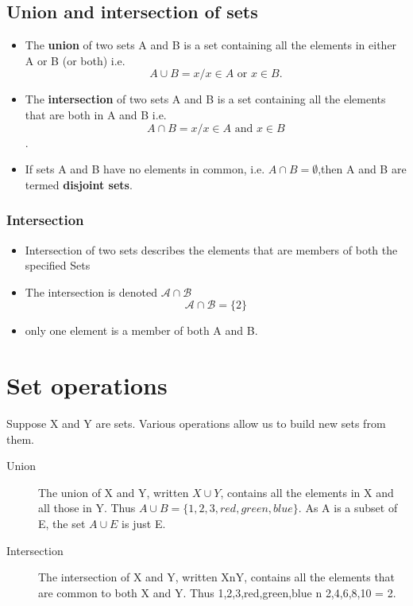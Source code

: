 \documentclass[12pt]{article}
\begin{document}
\subsection*{Union and intersection of sets}
\begin{itemize}
\item The \textbf{union} of two sets A and B is a set containing all the elements in
either A or B (or both)
i.e.
\[A \cup B = {x / x \in A \mbox{ or } x \in B}.\]
\item The \textbf{intersection} of two sets A and B is a set containing all the elements
that are both in A and B
i.e.
\[A \cap B = {x / x \in A \mbox{ and }x \in B}\].
\item If sets A and B have no elements in common, i.e. $A \cap B = \emptyset$,then A and B
are termed \textbf{disjoint sets}.
\end{itemize}
\newpage
\subsubsection*{Intersection}
\begin{itemize}
\item Intersection of two sets describes the elements that are members of both the specified Sets
\item The intersection is denoted $\mathcal{A\cap B}$
\[ \mathcal{A\cap B} = \{2\}\]
\item only one element is a member of both A and B.
\end{itemize}


\section{Set operations}
Suppose X and Y are sets. Various operations allow us to build new sets from them.
\begin{description}
\item[Union]
The union of X and Y, written $X\cup Y$, contains all the elements in X and all those in Y. Thus $A \cup B = \{1, 2, 3, red, green, blue\}$. As A is a subset of E, the set $A \cup E$ is just E.
\item[Intersection]
The intersection of X and Y, written XnY, contains all the elements that are common to both X and Y. Thus {1,2,3,red,green,blue} n {2,4,6,8,10} = {2}.
\end{description}
\end{document}
